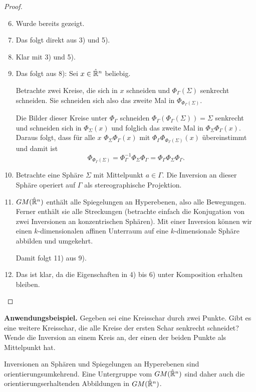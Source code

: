 \begin{proof}
 \begin{enumerate}[1)]
  \setcounter{enumi}{5}
  \item Wurde bereits gezeigt.
  \item Das folgt direkt aus 3) und 5).
  \item Klar mit 3) und 5).
  \item Das folgt aus 8): Sei $x \in \hat{\mathbb{R}}^n$ beliebig.
  
  Betrachte zwei Kreise, die sich in $x$ schneiden und $\Phi_\Gamma(\Sigma)$ senkrecht schneiden. Sie schneiden sich also das zweite Mal in $\Phi_{\Phi_\Gamma(\Sigma)}$. 
  
  Die Bilder dieser Kreise unter $\Phi_\Gamma$ schneiden $\Phi_\Gamma(\Phi_\Gamma(\Sigma)) = \Sigma$ senkrecht und schneiden sich in $\Phi_\Sigma(x)$ und folglich das zweite Mal in $\Phi_\Sigma \Phi_\Gamma(x)$. Daraus folgt, dass für alle $x$ $\Phi_\Sigma \Phi_\Gamma(x)$ mit $\Phi_\Gamma \Phi_{\Phi_\Gamma(\Sigma)}(x)$ übereinstimmt und damit ist
  \[ \Phi_{\Phi_\Gamma(\Sigma)}= \Phi_\Gamma^{-1} \Phi_\Sigma \Phi_\Gamma = \Phi_\Gamma \Phi_\Sigma \Phi_\Gamma. \]
  \item Betrachte eine Sphäre $\Sigma$ mit Mittelpunkt $a \in \Gamma$. Die
    Inversion an dieser Sphäre operiert auf $\Gamma$ als stereographische
    Projektion.
  \item $GM(\hat{\mathbb{R}}^n)$ enthält alle Spiegelungen an Hyperebenen, also alle
    Bewegungen. Ferner ent\-hält sie alle Streckungen (betrachte einfach die
    Konjugation von zwei Inversionen an konzentrischen Sphären). Mit einer
    Inversion können wir einen $k$-dimensionalen affinen Unterraum auf eine
    $k$-dimensionale Sphäre abbilden und umgekehrt.
  
    Damit folgt 11) aus 9).
  \item Das ist klar, da die Eigenschaften in 4) bis 6) unter Komposition
    erhalten bleiben. \qedhere
 \end{enumerate}
\end{proof}

\textbf{Anwendungsbeispiel.} Gegeben sei eine Kreisschar durch zwei Punkte. Gibt
es eine weitere Kreisschar, die alle Kreise der ersten Schar senkrecht
schneidet? Wende die Inversion an einem Kreis an, der einen der beiden Punkte als
Mittelpunkt hat.

Inversionen an Sphären und Spiegelungen an Hyperebenen sind
orientierungsumkehrend. Eine Untergruppe vom $GM(\hat{\mathbb{R}}^n)$ sind daher auch
die orientierungserhaltenden Abbildungen in $GM(\hat{\mathbb{R}}^n)$.

